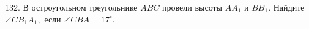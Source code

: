132. В остроугольном треугольнике $ABC$ провели высоты $AA_1$ и $BB_1.$ Найдите $\angle CB_1A_1,$ если $\angle CBA=17^\circ.$\\
